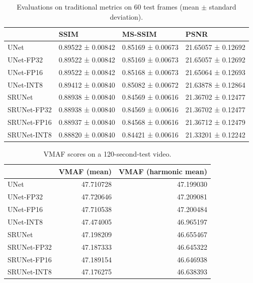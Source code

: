\begin{table}[t]
\begin{tabular}{llll}
\toprule
{} &               SSIM &            MS-SSIM &                PSNR \\
\midrule
UNet        &  0.89522 ± 0.00842 &  0.85169 ± 0.00673 &  21.65057 ± 0.12692 \\
UNet-FP32   &  0.89522 ± 0.00842 &  0.85169 ± 0.00673 &  21.65057 ± 0.12692 \\
UNet-FP16   &  0.89522 ± 0.00842 &  0.85168 ± 0.00673 &  21.65064 ± 0.12693 \\
UNet-INT8   &  0.89412 ± 0.00840 &  0.85082 ± 0.00672 &  21.63878 ± 0.12864 \\
\midrule
SRUNet      &  0.88938 ± 0.00840 &  0.84569 ± 0.00616 &  21.36702 ± 0.12477 \\
SRUNet-FP32 &  0.88938 ± 0.00840 &  0.84569 ± 0.00616 &  21.36702 ± 0.12477 \\
SRUNet-FP16 &  0.88937 ± 0.00840 &  0.84568 ± 0.00616 &  21.36712 ± 0.12479 \\
SRUNet-INT8 &  0.88820 ± 0.00840 &  0.84421 ± 0.00616 &  21.33201 ± 0.12242 \\
\bottomrule
\end{tabular}
\caption{Evaluations on traditional metrics on 60 test frames (mean $\pm$ standard deviation).}
\label{tab:traditional-metrics}
\end{table}

\begin{table}[t]
\begin{tabular}{lrr}
\toprule
{} &       VMAF (mean) &  VMAF (harmonic mean) \\
\midrule
UNet        &  47.710728 &      47.199030 \\
UNet-FP32   &  47.720646 &      47.209081 \\
UNet-FP16   &  47.710538 &      47.200484 \\
UNet-INT8   &  47.474005 &      46.965197 \\
\midrule
SRUNet      &  47.198209 &      46.655467 \\
SRUNet-FP32 &  47.187333 &      46.645322 \\
SRUNet-FP16 &  47.189154 &      46.646938 \\
SRUNet-INT8 &  47.176275 &      46.638393 \\
\bottomrule
\end{tabular}
\caption{VMAF scores on a 120-second-test video.}
\label{tab:vmaf}
\end{table}

